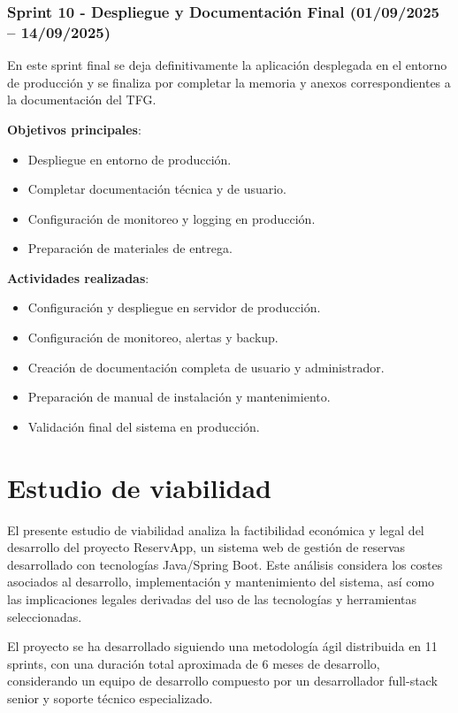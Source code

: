 \subsubsection{Sprint 10 - Despliegue y Documentación Final (01/09/2025 – 14/09/2025)} 
En este sprint final se deja definitivamente la aplicación desplegada en el entorno de producción y se finaliza por completar la memoria y anexos correspondientes a la documentación del TFG.

\textbf{Objetivos principales}:
\begin{itemize}
\tightlist
\item
Despliegue en entorno de producción.
\item
Completar documentación técnica y de usuario.
\item
Configuración de monitoreo y logging en producción.
\item
Preparación de materiales de entrega.
\end{itemize}

\textbf{Actividades realizadas}:
\begin{itemize}
\tightlist
\item
Configuración y despliegue en servidor de producción.
\item
Configuración de monitoreo, alertas y backup.
\item
Creación de documentación completa de usuario y administrador.
\item
Preparación de manual de instalación y mantenimiento.
\item
Validación final del sistema en producción.
\end{itemize}


\section{Estudio de viabilidad}
El presente estudio de viabilidad analiza la factibilidad económica y legal del desarrollo del proyecto ReservApp, un sistema web de gestión de reservas desarrollado con tecnologías Java/Spring Boot. Este análisis considera los costes asociados al desarrollo, implementación y mantenimiento del sistema, así como las implicaciones legales derivadas del uso de las tecnologías y herramientas seleccionadas.

El proyecto se ha desarrollado siguiendo una metodología ágil distribuida en 11 sprints, con una duración total aproximada de 6 meses de desarrollo, considerando un equipo de desarrollo compuesto por un desarrollador full-stack senior y soporte técnico especializado.

